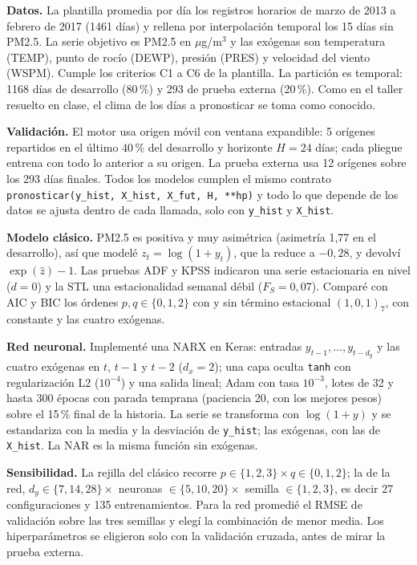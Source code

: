 \documentclass[11pt,letterpaper]{article}
\begin{document}
\textbf{Datos.} La plantilla promedia por día los registros horarios de marzo de 2013 a febrero de 2017 (1461 días) y rellena por interpolación temporal los 15 días sin PM2.5. La serie objetivo es PM2.5 en $\mu$g/m$^3$ y las exógenas son temperatura (TEMP), punto de rocío (DEWP), presión (PRES) y velocidad del viento (WSPM). Cumple los criterios C1 a C6 de la plantilla. La partición es temporal: 1168 días de desarrollo (80\,\%) y 293 de prueba externa (20\,\%). Como en el taller resuelto en clase, el clima de los días a pronosticar se toma como conocido.

\textbf{Validación.} El motor usa origen móvil con ventana expandible: 5 orígenes repartidos en el último 40\,\% del desarrollo y horizonte $H=24$ días; cada pliegue entrena con todo lo anterior a su origen. La prueba externa usa 12 orígenes sobre los 293 días finales. Todos los modelos cumplen el mismo contrato \texttt{pronosticar(y\_hist, X\_hist, X\_fut, H, **hp)} y todo lo que depende de los datos se ajusta dentro de cada llamada, solo con \texttt{y\_hist} y \texttt{X\_hist}.

\textbf{Modelo clásico.} PM2.5 es positiva y muy asimétrica (asimetría 1,77 en el desarrollo), así que modelé $z_t=\log(1+y_t)$, que la reduce a $-0{,}28$, y devolví $\exp(\hat z)-1$. Las pruebas ADF y KPSS indicaron una serie estacionaria en nivel ($d=0$) y la STL una estacionalidad semanal débil ($F_S = 0{,}07$). Comparé con AIC y BIC los órdenes $p,q\in\{0,1,2\}$ con y sin término estacional $(1,0,1)_7$, con constante y las cuatro exógenas.

\textbf{Red neuronal.} Implementé una NARX en Keras: entradas $y_{t-1},\dots,y_{t-d_y}$ y las cuatro exógenas en $t$, $t-1$ y $t-2$ ($d_x = 2$); una capa oculta \texttt{tanh} con regularización L2 ($10^{-4}$) y una salida lineal; Adam con tasa $10^{-3}$, lotes de 32 y hasta 300 épocas con parada temprana (paciencia 20, con los mejores pesos) sobre el 15\,\% final de la historia. La serie se transforma con $\log(1+y)$ y se estandariza con la media y la desviación de \texttt{y\_hist}; las exógenas, con las de \texttt{X\_hist}. La NAR es la misma función sin exógenas.

\textbf{Sensibilidad.} La rejilla del clásico recorre $p\in\{1,2,3\}\times q\in\{0,1,2\}$; la de la red, $d_y\in\{7,14,28\}\times$ neuronas $\in\{5,10,20\}\times$ semilla $\in\{1,2,3\}$, es decir 27 configuraciones y 135 entrenamientos. Para la red promedié el RMSE de validación sobre las tres semillas y elegí la combinación de menor media. Los hiperparámetros se eligieron solo con la validación cruzada, antes de mirar la prueba externa.
\end{document}
